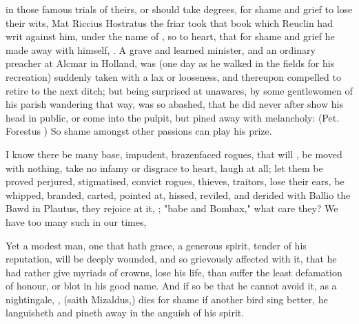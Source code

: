 in those famous trials of theirs, or should take degrees, for shame and grief
to lose their wits, Mat Riccius
 Hostratus the friar took
that book which Reuclin had writ against him, under the name of
, so to heart, that for shame
and grief he made away with himself, . A grave and learned minister, and an ordinary preacher at Alcmar in
Holland, was (one day as he walked in the fields for his recreation) suddenly
taken with a lax or looseness, and thereupon compelled to retire to the next
ditch; but being surprised at unawares, by some
gentlewomen of his parish wandering that way, was so abashed, that he did never
after show his head in public, or come into the pulpit, but pined away with
melancholy: (Pet. Forestus ) So shame amongst other passions can play his prize.

I know there be many base, impudent, brazenfaced rogues, that will
, be moved with nothing, take
no infamy or disgrace to heart, laugh at all; let them be proved perjured,
stigmatised, convict rogues, thieves, traitors, lose their ears, be whipped,
branded, carted, pointed at, hissed, reviled, and derided with
Ballio the Bawd in Plautus, they rejoice at it,
; "babe and Bombax," what care they? We have too many such
in our times,


Yet a modest man, one that hath grace, a generous spirit, tender of his
reputation, will be deeply wounded, and so grievously affected with it, that he
had rather give myriads of crowns, lose his life, than suffer the least
defamation of honour, or blot in his good name. And if so be that he cannot
avoid it, as a nightingale, , (saith
Mizaldus,) dies for shame if another bird sing better, he
languisheth and pineth away in the anguish of his spirit.

